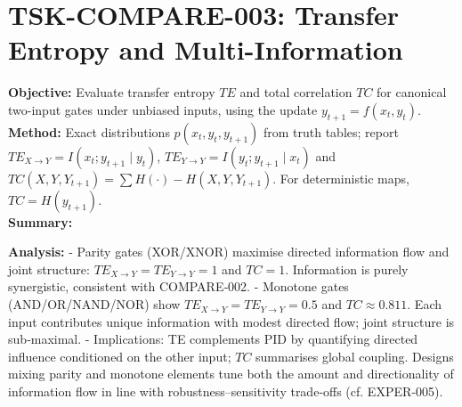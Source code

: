 \documentclass[11pt]{article}
\begin{document}
\section{TSK-COMPARE-003: Transfer Entropy and Multi-Information}
\textbf{Objective:} Evaluate transfer entropy $TE$ and total correlation $TC$ for canonical two-input gates under unbiased inputs, using the update $y_{t+1}=f(x_t,y_t)$.\\
\textbf{Method:} Exact distributions $p(x_t,y_t,y_{t+1})$ from truth tables; report $TE_{X\to Y}=I(x_t;y_{t+1}\mid y_t)$, $TE_{Y\to Y}=I(y_t;y_{t+1}\mid x_t)$ and $TC(X,Y,Y_{t+1})=\sum H(\cdot)-H(X,Y,Y_{t+1})$. For deterministic maps, $TC=H(y_{t+1})$.\\
\textbf{Summary:}\\
\begin{center}
\end{center}
\textbf{Analysis:}
- Parity gates (XOR/XNOR) maximise directed information flow and joint structure: $TE_{X\to Y}=TE_{Y\to Y}=1$ and $TC=1$. Information is purely synergistic, consistent with COMPARE‑002.
- Monotone gates (AND/OR/NAND/NOR) show $TE_{X\to Y}=TE_{Y\to Y}=0.5$ and $TC\approx0.811$. Each input contributes unique information with modest directed flow; joint structure is sub‑maximal.
- Implications: TE complements PID by quantifying directed influence conditioned on the other input; $TC$ summarises global coupling. Designs mixing parity and monotone elements tune both the amount and directionality of information flow in line with robustness–sensitivity trade‑offs (cf. EXPER‑005).
\end{document}
